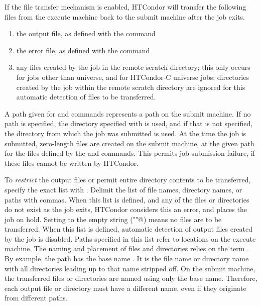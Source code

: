 If the file transfer mechanism is enabled,
HTCondor will transfer the following files from the execute machine
back to the submit machine after the job exits.
\begin{enumerate}
  \item the output file, as defined with the  command
  \item the error file, as defined with the  command
  \item any files created by the job in the remote scratch directory;
this only occurs for jobs other than 
universe, and for HTCondor-C  universe jobs;
directories created by the job within the remote scratch directory
are ignored for this automatic detection of files to be transferred.
\end{enumerate}

A path given for  and  commands represents
a path on the submit machine.  If no path is specified, the directory
specified with  is used, and if that is not specified,
the directory from which the job was submitted is used.
At the time the job is submitted, zero-length files are created
on the submit machine, at the given path for the files defined by the  
 and  commands.
This permits job submission failure, if these files cannot be written by
HTCondor.

To \emph{restrict} the output files 
or permit entire directory contents to be transferred,
specify the exact list with  .
Delimit the list of file names, directory names, or paths with commas.
When this list is defined, and any of the files or directories
do not exist as the job exits,
HTCondor considers this an error, and places the job on hold.
Setting  to the empty string (\verb@""@)
means no files are to be transferred.
When this list is defined, automatic detection of output files created by
the job is disabled.
Paths specified in this list refer to locations on the execute
machine.  
The naming and placement of files and directories relies on the
term .  
By example, the path  has the base name .
It is the file name or directory name with all directories
leading up to that name stripped off.
On the submit machine, the transferred files or directories
are named using only the base name.
Therefore, each output file or directory must have a different name,
even if they originate from different paths.

